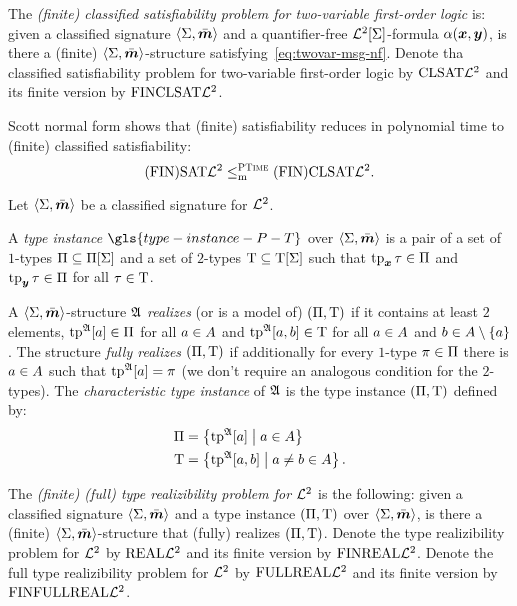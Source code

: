 \begin{definition}\label{def:clsig-twovar}
The \emph{(finite) classified satisfiability problem for two-variable
first-order logic} is:
given a classified signature $\left\langle \mathrm{\Sigma},\bar{\bm{m}} \right\rangle$ and a quantifier-free
$\mathcal{L}^{2}[\mathrm{\Sigma}]$-formula $\alpha(\bm{x},\bm{y})$, is there a (finite)
$\left\langle \mathrm{\Sigma},\bar{\bm{m}} \right\rangle$-structure satisfying~\cref{eq:twovar-msg-nf}.
Denote tha classified satisfiability problem for two-variable first-order logic
by $\mathrm{CLSAT}\mathcal{L}^{2}$ and its finite version by $\mathrm{FINCLSAT}\mathcal{L}^{2}$.
\end{definition}

Scott normal form shows that (finite) satisfiability reduces in polynomial time
to (finite) classified satisfiability:
\[
  \mathrm{(FIN)SAT}\mathcal{L}^{2} \leq_{\mathrm{m}}^{\text{\normalfont{\scshape PTime}}} \mathrm{(FIN)CLSAT}\mathcal{L}^{2}.
\]

Let $\left\langle \mathrm{\Sigma},\bar{\bm{m}} \right\rangle$ be a classified signature for $\mathcal{L}^{2}$.
\begin{definition}\label{def:tpinst-twovar}
A \emph{type instance} $\gls{type-instance-P-T}$ over $\left\langle \mathrm{\Sigma},\bar{\bm{m}} \right\rangle$ is a
pair of a set of $1$-types $\Pi \subseteq \Pi[\mathrm{\Sigma}]$ and a set of $2$-types
$\mathrm{T} \subseteq \mathrm{T}[\mathrm{\Sigma}]$ such that $\operatorname{tp}_{\bm{x}}\tau \in \Pi$ and $\operatorname{tp}_{\bm{y}}\tau \in
\Pi$ for all $\tau \in \mathrm{T}$.

A $\left\langle \mathrm{\Sigma},\bar{\bm{m}} \right\rangle$-structure $\mathfrak{A}$ \emph{realizes} (or is a model of)
$(\Pi,\mathrm{T})$ if it contains at least $2$ elements, $\operatorname{tp}^{\mathfrak{A}}[a] \in \Pi$
for all $a \in A$ and $\operatorname{tp}^{\mathfrak{A}}[a,b] \in \mathrm{T}$ for all $a \in A$
and $b \in A \setminus \left\{a\right\}$.
The structure \emph{fully realizes} $(\Pi,\mathrm{T})$ if additionally for every
$1$-type $\pi \in \Pi$ there is $a \in A$ such that $\operatorname{tp}^{\mathfrak{A}}[a] =
\pi$ (we don't require an analogous condition for the $2$-types).
The \emph{characteristic type instance} of $\mathfrak{A}$ is the type instance
$(\Pi,\mathrm{T})$ defined by:
\begin{align*}
\Pi &= \left\{\operatorname{tp}^{\mathfrak{A}}[a]\mathrel{}\middle|\mathrel{}a\in A\right\} \\
\mathrm{T} &= \left\{\operatorname{tp}^{\mathfrak{A}}[a,b]\mathrel{}\middle|\mathrel{}a\neq b \in A\right\}.
\end{align*}

The \emph{(finite) (full) type realizibility problem for $\mathcal{L}^{2}$} is the
following:
given a classified signature $\left\langle \mathrm{\Sigma},\bar{\bm{m}} \right\rangle$ and a type instance
$(\Pi,\mathrm{T})$ over $\left\langle \mathrm{\Sigma},\bar{\bm{m}} \right\rangle$, is there a (finite)
$\left\langle \mathrm{\Sigma},\bar{\bm{m}} \right\rangle$-structure that (fully) realizes $(\Pi,\mathrm{T})$.
Denote the type realizibility problem for $\mathcal{L}^{2}$ by
$\mathrm{REAL}\mathcal{L}^{2}$ and its finite version by $\mathrm{FINREAL}\mathcal{L}^{2}$.
Denote the full type realizibility problem for $\mathcal{L}^{2}$ by
$\mathrm{FULLREAL}\mathcal{L}^{2}$ and its finite version by $\mathrm{FINFULLREAL}\mathcal{L}^{2}$.
\end{definition}

